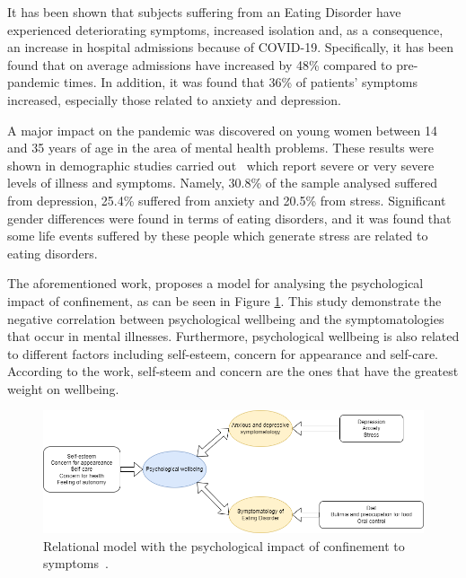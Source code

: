 It has been shown that subjects suffering from an Eating Disorder have experienced deteriorating symptoms, increased isolation and, as a consequence, an increase in hospital admissions because of COVID-19. Specifically, it has been found that on average admissions have increased by 48\% compared to pre-pandemic times. In addition, it was found that 36\% of patients' symptoms increased, especially those related to anxiety and depression.

A major impact on the pandemic was discovered on young women between 14 and 35 years of age in the area of mental health problems. These results were shown in demographic studies carried out~\cite{vall2021impacto} which report severe or very severe levels of illness and symptoms. Namely, 30.8\% of the sample analysed suffered from depression, 25.4\% suffered from anxiety and 20.5\% from stress. Significant gender differences were found in terms of eating disorders, and it was found that some life events suffered by these people which generate stress are related to eating disorders.

The aforementioned work, proposes a model for analysing the psychological impact of confinement, as can be seen in Figure \ref{fig:vall_diagram}. This study demonstrate the negative correlation between psychological wellbeing and the symptomatologies that occur in mental illnesses. Furthermore, psychological wellbeing is also related to different factors including self-esteem, concern for appearance and self-care. According to the work, self-steem and concern are the ones that have the greatest weight on wellbeing.

\begin{figure}[!htp]
    \centering
    \includegraphics[scale=0.53]{img/introduction/vall_diagram.png}
    \caption{Relational model with the psychological impact of confinement to symptoms~\cite{vall2021impacto}.}
    \label{fig:vall_diagram}
\end{figure}




